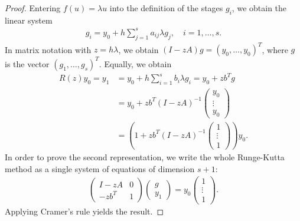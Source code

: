 

\begin{proof}
  Entering $f(u) = \lambda u$ into the definition of the stages $g_i$,
  we obtain the linear system
  \begin{gather*}
    g_i = y_0 + h \sum_{j=1}^s a_{ij}\lambda g_j, \quad i=1,\dots,s.
  \end{gather*}
  In matrix notation with $z=h\lambda$, we obtain
  $(I-z A) g = (y_0,\dots,y_0)^T$, where $g$ is the vector
  $(g_1,\dots,g_s)^T$. Equally, we obtain
  \begin{align*}
    R(z) y_0 = y_1 &= y_0 + h \sum_{i=1}^s b_i \lambda g_i = y_0 + z
    b^T g\\
    &= y_0 + z b^T(I-z A)^{-1}
    \begin{pmatrix}
      y_0\\\vdots\\y_0
    \end{pmatrix}
    \\
    &= \left(1+z b^T(I-z A)^{-1}
      \begin{pmatrix}
        1\\\vdots\\1
      \end{pmatrix}
    \right) y_0.
  \end{align*}
  In order to prove the second representation, we write the whole Runge-Kutta method
  as a single system of equations of dimension $s+1$:
  \begin{gather*}
    \begin{pmatrix}
      I-z A & 0 \\
      -z b^T & 1
    \end{pmatrix}
    \begin{pmatrix}
      g \\ y_1
    \end{pmatrix}
    = y_0
    \begin{pmatrix}
      1\\\vdots\\1
    \end{pmatrix}.
  \end{gather*}
  Applying Cramer's rule yields the result.
\end{proof}

